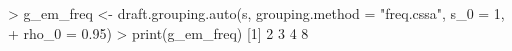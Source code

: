 \begin{CodeChunk}
\begin{CodeInput}


> g_em_freq <- draft.grouping.auto(s, grouping.method = "freq.cssa", s_0 = 1, 
+                                  rho_0 = 0.95)
> print(g_em_freq)
[1] 2 3 4 8
\end{CodeInput}

\end{CodeChunk}